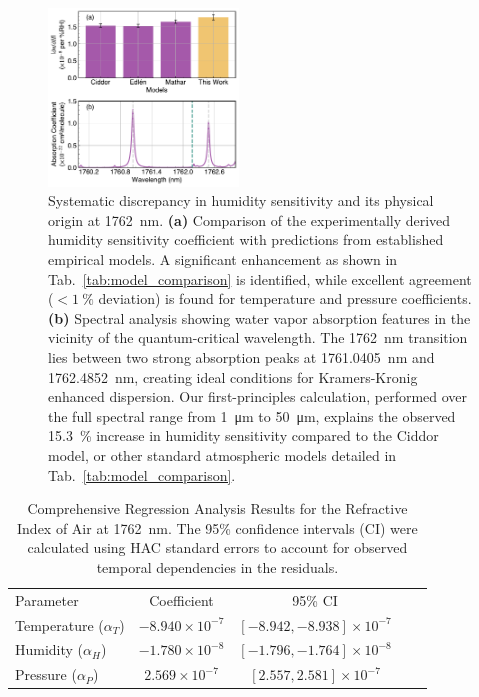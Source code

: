 \documentclass[aps,pra,reprint,groupedaddress,twocolumn,superscriptaddress]{revtex4-2}
\begin{document}
\begin{figure}
\centering
\includegraphics[width=0.45\textwidth]{figures/fig3_humidity_discrepancy.pdf}
\caption{
Systematic discrepancy in humidity sensitivity and its physical origin at \SI{1762}{\nano\meter}.
\textbf{(a)} Comparison of the experimentally derived humidity sensitivity coefficient with predictions from established empirical models. A significant enhancement as shown in Tab.~\ref{tab:model_comparison} is identified, while excellent agreement ($<\SI{1}{\percent}$ deviation) is found for temperature and pressure coefficients.
\textbf{(b)} Spectral analysis showing water vapor absorption features in the vicinity of the quantum-critical wavelength. The \SI{1762}{\nano\meter} transition lies between two strong absorption peaks at \SI{1761.0405}{\nano\meter} and \SI{1762.4852}{\nano\meter}, creating ideal conditions for Kramers-Kronig enhanced dispersion. Our first-principles calculation, performed over the full spectral range from \SI{1}{\micro\meter} to \SI{50}{\micro\meter}, explains the observed \SI{15.3}{\percent} increase in humidity sensitivity compared to the Ciddor model, or other standard atmospheric models detailed in Tab.~\ref{tab:model_comparison}.
}
\label{fig:humidity_discrepancy}
\end{figure}

\begin{table}
\centering
\caption{\label{tab:suppression_coefficients}
Comprehensive Regression Analysis Results for the Refractive Index of Air at \SI{1762}{\nano\meter}. The 95\% confidence intervals (CI) were calculated using HAC standard errors to account for observed temporal dependencies in the residuals.}
\begin{ruledtabular}
\begin{tabular}{lcccc}
Parameter & Coefficient & {95\% CI} \\
\colrule
Temperature ($\alpha_T$) & $-8.940 \times 10^{-7}$ & $[-8.942, -8.938] \times 10^{-7}$ \\
Humidity ($\alpha_H$) & $-1.780 \times 10^{-8}$ & $[-1.796, -1.764] \times 10^{-8}$ \\
Pressure ($\alpha_P$) & $2.569 \times 10^{-7}$ & $[2.557, 2.581] \times 10^{-7}$ \\
\end{tabular}
\end{ruledtabular}
\end{table}
\end{document}
